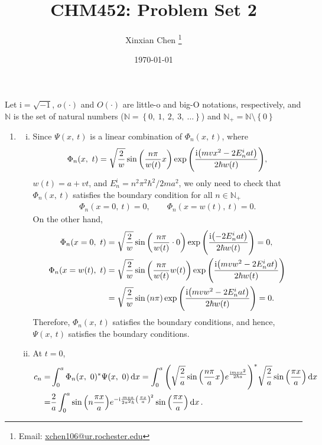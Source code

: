 \documentclass{article}
\title{CHM452: Problem Set 2}
\author{Xinxian Chen%
\footnote{Email: \href{mailto:xchen106@ur.rochester.edu}{xchen106@ur.rochester.edu}}}
\date{\today}
\newcommand{\iu}{\ensuremath{\mathrm{i}}}
\newcommand{\set}[1]{\ensuremath{\left\{{#1}\right\}}}
\begin{document}
\maketitle

Let $\iu = \sqrt{-1}$, $o(\cdot)$ and $O(\cdot)$ are little-o and big-O notations, respectively, and $\mathbb{N}$ is the set of natural numbers ($\mathbb{N} = \set{0,\ 1,\ 2,\ 3,\ \ldots}$) and $\mathbb{N}_+ = \mathbb{N}\setminus\set{0}$

\begin{enumerate}[1.]
  \item 
  \begin{enumerate}[(i)]
    \item Since $\Psi(x,\ t)$ is a linear combination of $\Phi_n(x,\ t)$, where
    \begin{align*}
      \Phi_n(x,\ t) = \sqrt{\frac{2}{w}}\sin\qty(\frac{n\pi}{w(t)}x)\exp\qty(\frac{\iu\qty(mvx^2 - 2E_n^iat)}{2\hbar w(t)}),
    \end{align*}
    $w(t) =a + vt$, and $E_n^i = n^2\pi^2\hbar^2/2ma^2$, we only need to check that $\Phi_n(x,\ t)$ satisfies the boundary condition for all $n \in \mathbb{N}_+$
    \begin{align*}
      \Phi_n(x=0,\ t) = 0, \qquad \Phi_n(x=w(t),\ t) = 0.
    \end{align*}
    On the other hand,
    \begin{align*}
      \Phi_n(x=0,\ t) &= \sqrt{\frac{2}{w}}\sin\qty(\frac{n\pi}{w(t)} \cdot 0)\exp\qty(\frac{\iu\qty(- 2E_n^iat)}{2\hbar w(t)}) = 0,\\
      \Phi_n(x=w(t),\ t) &= \sqrt{\frac{2}{w}}\sin\qty(\frac{n\pi}{w(t)} w(t))\exp\qty(\frac{\iu\qty(mvw^2 - 2E_n^iat)}{2\hbar w(t)}) \\
      &=\sqrt{\frac{2}{w}}\sin\qty(n \pi)\exp\qty(\frac{\iu\qty(mvw^2 - 2E_n^iat)}{2\hbar w(t)}) = 0.
    \end{align*}
    Therefore, $\Phi_n(x,\ t)$ satisfies the boundary conditions, and hence, $\Psi(x,\ t)$ satisfies the boundary conditions.
    \item At $t=0$,
    \begin{align*}
      c_n =& \int_0^a \Phi_n(x,\ 0)^* \Psi(x,\ 0) \dd{x} = \int_0^a \qty( \sqrt{\frac{2}{a}}\sin\qty(\frac{n\pi}{a}x)e^{\frac{\iu mvx^2}{2\hbar a}})^*  \sqrt{\frac{2}{a}}\sin\qty(\frac{\pi x}{a}) \dd{x}\\
      =& \frac{2}{a} \int_0^a \sin\qty(n\frac{\pi x}{a})e^{-\iu\frac{mva}{2\pi^2\hbar} \qty(\frac{\pi x}{a})^2} \sin\qty(\frac{\pi x}{a}) \dd{x}.
    \end{align*}

\end{enumerate}
\end{enumerate}
\end{document}
